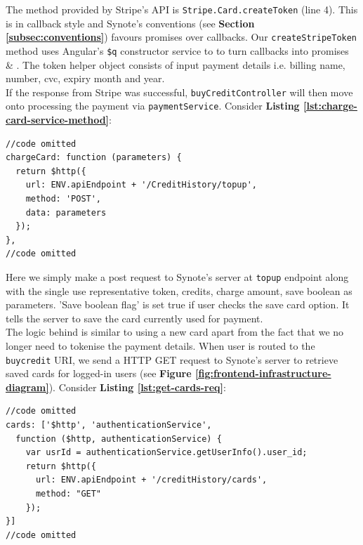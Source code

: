 The method provided by Stripe’s API is \texttt{Stripe.Card.createToken} (line 4). This is in callback style and Synote’s conventions (see \textbf{Section \ref{subsec:conventions}}) favours promises over callbacks. Our \texttt{createStripeToken} method uses Angular’s \texttt{\$q} constructor service to to turn callbacks into promises \cite{jdotjdot} \& \cite{angularjsq}. The token helper object consists of input payment details i.e. billing name, number, cvc, expiry month and year.\\

If the response from Stripe was successful, \texttt{buyCreditController} will then move onto processing the payment via \texttt{paymentService}. Consider \textbf{Listing \ref{lst:charge-card-service-method}}:\\

\begin{listing}[H]
\begin{verbatim}
//code omitted
chargeCard: function (parameters) {
  return $http({
    url: ENV.apiEndpoint + '/CreditHistory/topup',
    method: 'POST',
    data: parameters
  });
},
//code omitted
\end{verbatim}
\label{lst:charge-card-service-method}
\end{listing}

Here we simply make a post request to Synote’s server at \texttt{topup} endpoint along with the single use representative token, credits, charge amount, save boolean as parameters. 'Save boolean flag' is set true if user checks the save card option. It tells the server to save the card currently used for payment.\\

The logic behind is similar to using a new card apart from the fact that we no longer need to tokenise the payment details. When user is routed to the \texttt{buycredit} URI, we send a HTTP GET request to Synote’s server to retrieve saved cards for logged-in users (see \textbf{Figure \ref{fig:frontend-infrastructure-diagram}}). Consider \textbf{Listing \ref{lst:get-cards-req}}:\\

\begin{listing}[H]
\begin{verbatim}
//code omitted
cards: ['$http', 'authenticationService',
  function ($http, authenticationService) {
    var usrId = authenticationService.getUserInfo().user_id;
    return $http({
      url: ENV.apiEndpoint + '/creditHistory/cards',
      method: "GET"
    });
}]
//code omitted
\end{verbatim}
\label{lst:get-cards-req}
\end{listing}

